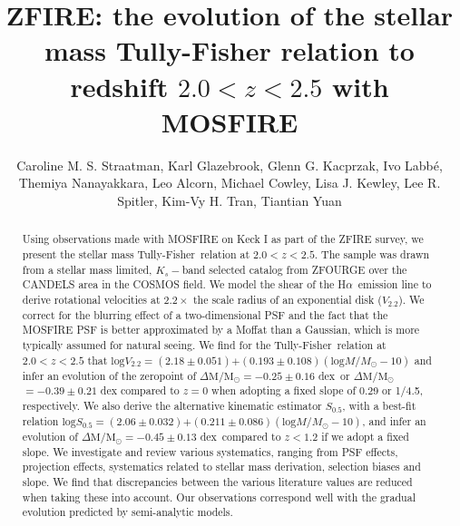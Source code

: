 \documentclass{emulateapj}
\newcommand{\ha}{H$\alpha$}
\newcommand{\msun}{$\mathrm{M_{\odot}}$}
\newcommand{\tf}{Tully-Fisher}
\newcommand{\bc}{$(2.18\pm0.051)$}%
\newcommand{\afree}{$(0.193\pm0.108)$}
\newcommand{\ev}{$\Delta \mathrm{M}/$\msun$=-0.25\pm0.16$ dex}
\newcommand{\evbell}{$\Delta \mathrm{M}/$\msun$=-0.39\pm0.21$ dex}
\newcommand{\bsfree}{$(2.06\pm0.032)$}
\newcommand{\asfree}{$(0.211\pm0.086)$}
\newcommand{\sev}{$\Delta \mathrm{M}/$\msun$=-0.45\pm0.13$ dex}
\begin{document}
\title{ZFIRE: the evolution of the stellar mass Tully-Fisher relation to redshift $2.0<z<2.5$ with MOSFIRE}

\author{Caroline M. S. Straatman, Karl Glazebrook, Glenn G. Kacprzak, Ivo Labb\'e, Themiya Nanayakkara, Leo Alcorn, Michael Cowley, Lisa J. Kewley, Lee R. Spitler, Kim-Vy H. Tran, Tiantian Yuan}



\begin{abstract}
Using observations made with MOSFIRE on Keck I as part of the ZFIRE survey, we present the stellar mass \tf\ relation at $2.0 < z < 2.5$. The sample was drawn from a stellar mass limited, $K_s-$band selected catalog from ZFOURGE over the CANDELS area in the COSMOS field. We model the shear of the \ha\ emission line to derive rotational velocities at $2.2\times$ the scale radius of an exponential disk ($V_{2.2}$). We correct for the blurring effect of a two-dimensional PSF and the fact that the MOSFIRE PSF is better approximated by a Moffat than a Gaussian, which is more typically assumed for natural seeing. We find for the \tf\ relation at $2.0<z<2.5$ that $\mathrm{log}V_{2.2}=$\bc$+$\afree$(\mathrm{log}M/M_{\odot}-10)$ and infer an evolution of the zeropoint of \ev\ {or \evbell} compared to $z=0$ when adopting a fixed slope {of 0.29 or 1/4.5, respectively}. We also derive the alternative kinematic estimator $S_{0.5}$, with a best-fit relation $\mathrm{log}S_{0.5}=$\bsfree$+$\asfree$(\mathrm{log}M/M_{\odot}-10)$, and infer an evolution of \sev\ compared to $z<1.2$ if we adopt a fixed slope. We investigate and review various systematics, ranging from PSF effects, projection effects, systematics related to stellar mass derivation, selection biases {and slope}. We find that discrepancies between the various literature values are reduced when taking these into account. {Our observations correspond} well with {the gradual evolution predicted by} semi-analytic model{s}.  
\end{abstract}
\end{document}
